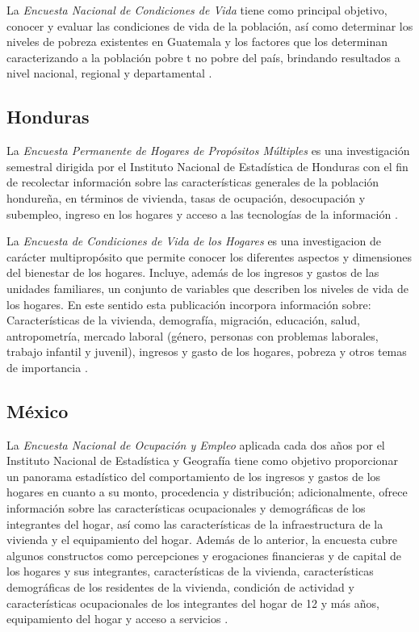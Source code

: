 \documentclass[
  12pt,
  spanish,
]{book}
\begin{document}
La \emph{Encuesta Nacional de Condiciones de Vida} tiene como principal objetivo, conocer y evaluar las condiciones de vida de la población, así como determinar los niveles de pobreza existentes en Guatemala y los factores que los determinan caracterizando a la población pobre t no pobre del país, brindando resultados a nivel nacional, regional y departamental \citep{INE2-GT}.

\hypertarget{honduras}{%
\subsection{Honduras}\label{honduras}}

La \emph{Encuesta Permanente de Hogares de Propósitos Múltiples} es una investigación semestral dirigida por el Instituto Nacional de Estadística de Honduras con el fin de recolectar información sobre las características generales de la población hondureña, en términos de vivienda, tasas de ocupación, desocupación y subempleo, ingreso en los hogares y acceso a las tecnologías de la información \citep{INE-HN}.

La \emph{Encuesta de Condiciones de Vida de los Hogares} es una investigacion de carácter multipropósito que permite conocer los diferentes aspectos y dimensiones del bienestar de los hogares. Incluye, además de los ingresos y gastos de las unidades familiares, un conjunto de variables que describen los niveles de vida de los hogares. En este sentido esta publicación incorpora información sobre: Características de la vivienda, demografía, migración, educación, salud, antropometría, mercado laboral (género, personas con problemas laborales, trabajo infantil y juvenil), ingresos y gasto de los hogares, pobreza y otros temas de importancia \citep{INE2-HN}.

\hypertarget{muxe9xico}{%
\subsection{México}\label{muxe9xico}}

La \emph{Encuesta Nacional de Ocupación y Empleo} aplicada cada dos años por el Instituto Nacional de Estadística y Geografía tiene como objetivo proporcionar un panorama estadístico del comportamiento de los ingresos y gastos de los hogares en cuanto a su monto, procedencia y distribución; adicionalmente, ofrece información sobre las características ocupacionales y demográficas de los integrantes del hogar, así como las características de la infraestructura de la vivienda y el equipamiento del hogar. Además de lo anterior, la encuesta cubre algunos constructos como percepciones y erogaciones financieras y de capital de los hogares y sus integrantes, características de la vivienda, características demográficas de los residentes de la vivienda, condición de actividad y características ocupacionales de los integrantes del hogar de 12 y más años, equipamiento del hogar y acceso a servicios \citep{INEGI-MX}.
\end{document}
